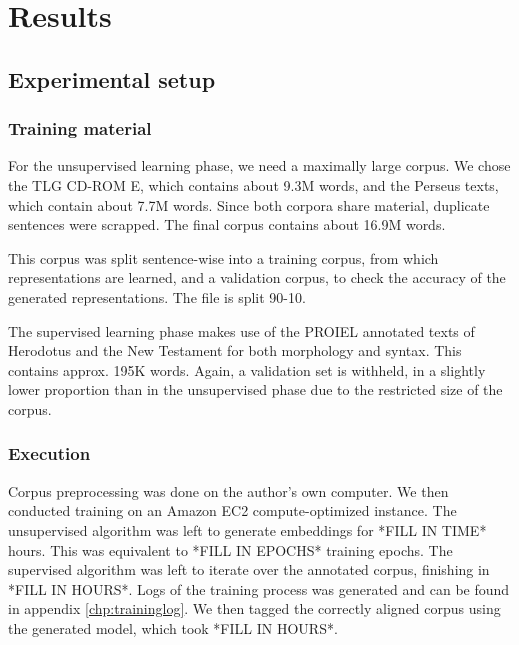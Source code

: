 \chapter{Results}
\label{chp:results}

\section{Experimental setup}
\label{sec:computationtime}

\subsection{Training material}
\label{sec:trainingmaterial}
For the unsupervised learning phase, we need a maximally large
corpus. We chose the TLG CD-ROM E, which contains about 9.3M words, and
the Perseus texts, which contain about 7.7M words. Since both corpora
share material, duplicate sentences were scrapped. The final corpus
contains about 16.9M words.

This corpus was split sentence-wise into a training corpus, from which
representations are learned, and a validation corpus, to check the
accuracy of the generated representations. The file is split 90-10.

The supervised learning phase makes use of the PROIEL annotated texts
of Herodotus and the New Testament for both morphology and
syntax. This contains approx. 195K words. Again, a validation set is
withheld, in a slightly lower proportion than in the unsupervised
phase due to the restricted size of the corpus.

\subsection{Execution}
\label{sec:execution}

Corpus preprocessing was done on the author's own computer. We then
conducted training on an Amazon EC2 compute-optimized instance. The
unsupervised algorithm was left to generate embeddings for *FILL IN
TIME* hours.  This was equivalent to *FILL IN EPOCHS* training
epochs. The supervised algorithm was left to iterate over the
annotated corpus, finishing in *FILL IN HOURS*. Logs of the training
process was generated and can be found in appendix
\vref{chp:traininglog}. We then tagged the correctly aligned corpus
using the generated model, which took *FILL IN HOURS*.

